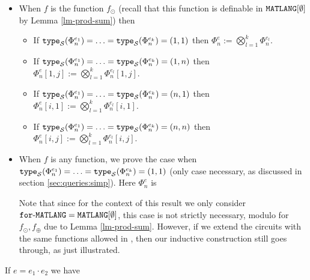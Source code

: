 \begin{itemize}
  \item When $f$ is the function $f_{\odot}$ (recall that this function is definable in $\texttt{MATLANG}[\emptyset]$ by Lemma \ref{lm-prod-sum}) then
  \begin{itemize}
    \item If $\texttt{type}_{\mathcal{S}}(\Phi^{e_1}_n)=\ldots =\texttt{type}_{\mathcal{S}}(\Phi^{e_k}_n)=(1, 1)$ then $\Phi^e_n:=\bigotimes_{l=1}^k \Phi^{e_l}_n$.
    \item If $\texttt{type}_{\mathcal{S}}(\Phi^{e_1}_n)=\ldots =\texttt{type}_{\mathcal{S}}(\Phi^{e_k}_n)=(1, n)$ then $\Phi^e_n[1,j]:=\bigotimes_{l=1}^k \Phi^{e_l}_n[1,j]$.
    \item If $\texttt{type}_{\mathcal{S}}(\Phi^{e_1}_n)=\ldots =\texttt{type}_{\mathcal{S}}(\Phi^{e_k}_n)=(n, 1)$ then $\Phi^e_n[i,1]:=\bigotimes_{l=1}^k \Phi^{e_l}_n[i,1]$.
    \item If $\texttt{type}_{\mathcal{S}}(\Phi^{e_1}_n)=\ldots =\texttt{type}_{\mathcal{S}}(\Phi^{e_k}_n)=(n, n)$ then $\Phi^e_n[i,j]:=\bigotimes_{l=1}^k \Phi^{e_l}_n[i,j]$.
  \end{itemize}
	\item When $f$ is any function, we prove the case when $\texttt{type}_{\mathcal{S}}(\Phi^{e_1}_n)=\ldots =\texttt{type}_{\mathcal{S}}(\Phi^{e_k}_n)=(1, 1)$
  (only case necessary, as discussed in section \ref{sec:queries:simp}). Here $\Phi^e_n$ is 
	
\begin{center}
\end{center}

Note that since for the context of this result we only consider $\texttt{for}\text{-}\texttt{MATLANG} = \texttt{MATLANG}[\emptyset]$, this case is not strictly necessary, modulo for $f_\odot,f_\oplus$ due to Lemma \ref{lm-prod-sum}. However, if we extend the circuits with the same functions allowed in \langfor, then our inductive construction still goes through, as just illustrated.

\end{itemize}

If $e=e_1\cdot e_2$ we have

